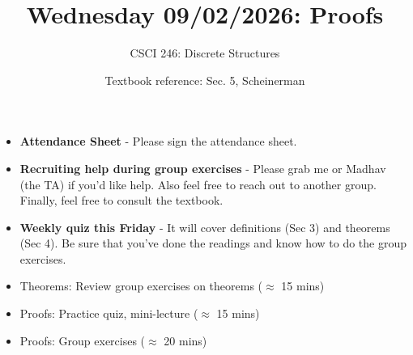 \documentclass[10pt]{beamer}
\begin{document}






\title{Wednesday 09/02/2026: Proofs}
\author{CSCI 246: Discrete Structures}
\date{Textbook reference: Sec. 5, Scheinerman}

\begin{frame}
    \titlepage 
\end{frame}


\begin{frame}

\begin{mygreenbox}[title=Announcements]
\begin{itemize}
\item \textbf{Attendance Sheet} - Please sign the attendance sheet.
\item \textbf{Recruiting help during group exercises} - Please grab me or Madhav (the TA) if you'd like help.  Also feel free to reach out to another group. Finally, feel free to consult the textbook.
\item \textbf{Weekly quiz this Friday} - It will cover definitions (Sec 3) and theorems (Sec 4).  Be sure that you've done the readings and know how to do the group exercises. 
\end{itemize}

\end{mygreenbox}

\vfill  \vfill 


\begin{myyellowbox}[title=Today's Agenda]
\begin{itemize}
	\item Theorems: Review group exercises on theorems ($\approx$ 15 mins)
	\item Proofs: Practice quiz, mini-lecture ($\approx$ 15 mins)
	\item Proofs: Group exercises ($\approx$ 20 mins) 
\end{itemize}


\end{myyellowbox}
\vfill 

\end{frame}
\end{document}
